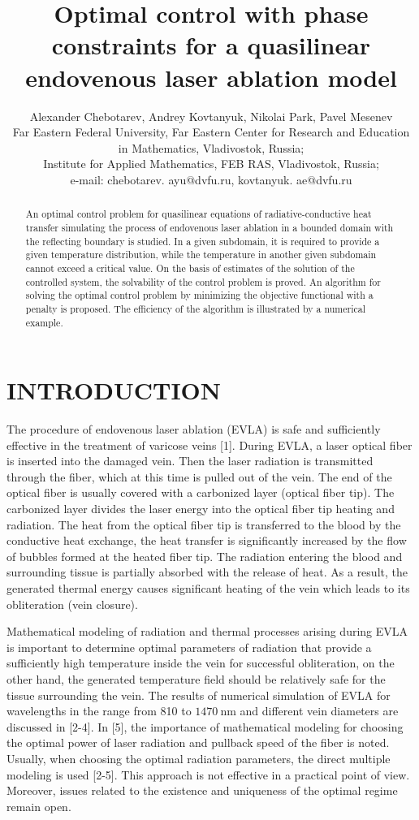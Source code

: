 \documentclass[10pt]{article}
\title{Optimal control with phase constraints for a quasilinear endovenous laser ablation model }
\author{Alexander Chebotarev, Andrey Kovtanyuk, Nikolai Park, Pavel Mesenev\\
Far Eastern Federal University, Far Eastern Center for Research and Education\\
in Mathematics, Vladivostok, Russia;\\
Institute for Applied Mathematics, FEB RAS, Vladivostok, Russia;\\
e-mail: chebotarev. ayu@dvfu.ru, kovtanyuk. ae@dvfu.ru}
\date{}
\begin{document}
\maketitle


\begin{abstract}
An optimal control problem for quasilinear equations of radiative-conductive heat transfer simulating the process of endovenous laser ablation in a bounded domain with the reflecting boundary is studied. In a given subdomain, it is required to provide a given temperature distribution, while the temperature in another given subdomain cannot exceed a critical value. On the basis of estimates of the solution of the controlled system, the solvability of the control problem is proved. An algorithm for solving the optimal control problem by minimizing the objective functional with a penalty is proposed. The efficiency of the algorithm is illustrated by a numerical example.
\end{abstract}

\section{INTRODUCTION}
The procedure of endovenous laser ablation (EVLA) is safe and sufficiently effective in the treatment of varicose veins [1]. During EVLA, a laser optical fiber is inserted into the damaged vein. Then the laser radiation is transmitted through the fiber, which at this time is pulled out of the vein. The end of the optical fiber is usually covered with a carbonized layer (optical fiber tip). The carbonized layer divides the laser energy into the optical fiber tip heating and radiation. The heat from the optical fiber tip is transferred to the blood by the conductive heat exchange, the heat transfer is significantly increased by the flow of bubbles formed at the heated fiber tip. The radiation entering the blood and surrounding tissue is partially absorbed with the release of heat. As a result, the generated thermal energy causes significant heating of the vein which leads to its obliteration (vein closure).

Mathematical modeling of radiation and thermal processes arising during EVLA is important to determine optimal parameters of radiation that provide a sufficiently high temperature inside the vein for successful obliteration, on the other hand, the generated temperature field should be relatively safe for the tissue surrounding the vein. The results of numerical simulation of EVLA for wavelengths in the range from 810 to $1470 \mathrm{~nm}$ and different vein diameters are discussed in [2-4]. In [5], the importance of mathematical modeling for choosing the optimal power of laser radiation and pullback speed of the fiber is noted. Usually, when choosing the optimal radiation parameters, the direct multiple modeling is used [2-5]. This approach is not effective in a practical point of view. Moreover, issues related to the existence and uniqueness of the optimal regime remain open.
\end{document}
